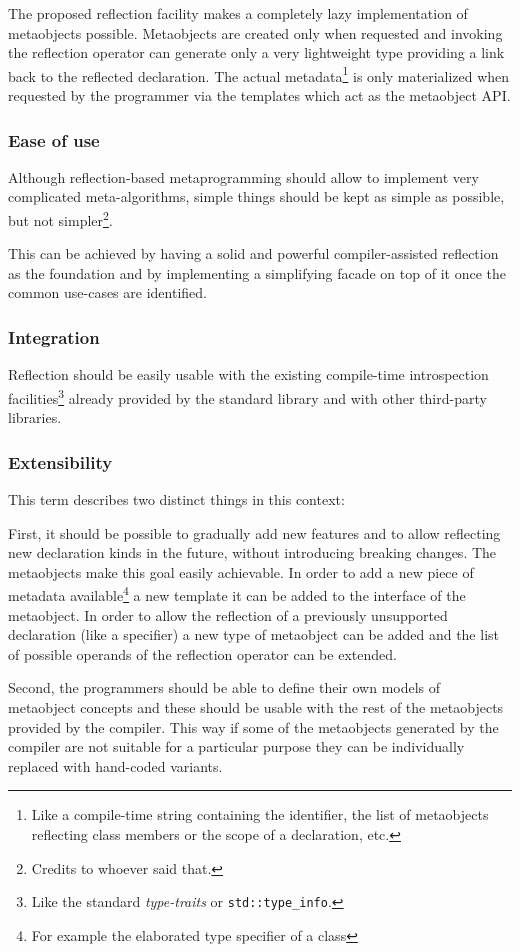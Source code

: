 The proposed reflection facility makes a completely lazy implementation of
metaobjects possible. Metaobjects are created only when requested and invoking
the reflection operator can generate only a very
lightweight type providing a link back to the reflected declaration. The actual
metadata\footnote{Like a compile-time string containing the identifier,
the list of metaobjects reflecting class members or the scope of a declaration,
etc.} is only materialized when requested by the programmer via the
templates which act as the metaobject API.

\subsubsection{Ease of use}
\label{design-ease-of-use}

Although reflection-based metaprogramming should allow to implement very
complicated meta-algorithms, simple things should be kept as simple as possible,
but not simpler\footnote{Credits to whoever said that.}.

This can be achieved by having a solid and powerful compiler-assisted reflection
as the foundation and by implementing a simplifying facade on top of it once
the common use-cases are identified.

\subsubsection{Integration}
\label{design-integration}

Reflection should be easily
usable with the existing compile-time introspection facilities\footnote{Like the
standard {\em type-traits} or \texttt{std::type\_info}.}
already provided by the standard library and with other third-party libraries.

\subsubsection{Extensibility}
\label{design-extensibility}

This term describes two distinct things in this context:

First, it should be possible to gradually add new features and to allow
reflecting new declaration kinds
in the future, without introducing breaking changes. The metaobjects make this
goal easily achievable. In order to add a new piece of metadata available\footnote{
For example the elaborated type specifier of a class} a new template 
it can be added to the interface of the metaobject. In order to allow the reflection
of a previously unsupported declaration (like a specifier) a new type of metaobject
can be added and the list of possible operands of the reflection operator
can be extended.

Second, the programmers should be able to define their own models of metaobject concepts
and these should be usable with the rest of the metaobjects provided by the
compiler. This way if some of the metaobjects generated by the compiler are not
suitable for a particular purpose they can be individually replaced with
hand-coded variants.


